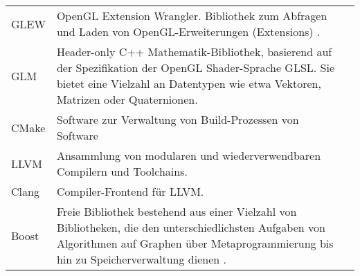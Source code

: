 \begin{longtabu}{p{0.2\textwidth}p{0.7\textwidth}p{0.1\textwidth}}
    GLEW       & OpenGL Extension Wrangler. Bibliothek zum Abfragen
                           und Laden von OpenGL-Erweiterungen (Extensions)
                           \parencite{wikipedia_the_free_encyclopedia_opengl_2015-1}.
                           &\protect\footnotemark{}\\

    GLM        & Header-only C++ Mathematik-Bibliothek, basierend auf
                           der Spezifikation der OpenGL Shader-Sprache GLSL.
                           Sie bietet eine Vielzahl an Datentypen wie etwa
                           Vektoren, Matrizen oder Quaternionen.
                           &\protect\footnotemark{}\\

    CMake      & Software zur Verwaltung von Build-Prozessen von 
                           Software
                           &\protect\footnotemark{}\\

    LLVM       & Ansammlung von modularen und wiederverwendbaren
                           Compilern und Toolchains.
                           &\protect\footnotemark{}\\

    Clang      & Compiler-Frontend für LLVM.\@
                           &\protect\footnotemark{}\\

    Boost      & Freie Bibliothek bestehend aus einer Vielzahl von
                           Bibliotheken, die den unterschiedlichsten
                           Aufgaben von Algorithmen auf Graphen über 
                           Metaprogrammierung bis hin zu Speicherverwaltung
                           dienen
                           \parencite{wikipedia_the_free_encyclopedia_boost_2015}.
                           &\protect\footnotemark{}\\
    \bottomrule
\end{longtabu}
